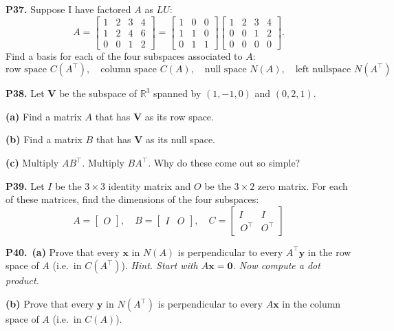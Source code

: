\documentclass[12pt]{amsart}
\newcommand{\bx}{\bm{x}}
\newcommand{\by}{\bm{y}}
\newcommand{\bV}{\bm{V}}
\newcommand{\bzero}{\bm{0}}
\newcommand{\RR}{\mathbb{R}}
\newcommand{\prob}[1]{\bigskip\noindent\textbf{#1.}\quad }
\newcommand{\epart}[1]{\medskip\noindent\textbf{(#1)}\quad }
\newcommand{\ppart}[1]{\,\textbf{(#1)}\quad }
\begin{document}
\prob{P37}  Suppose I have factored $A$ as $LU$:
    $$A = \begin{bmatrix} 1 & 2 & 3 & 4 \\
                         1 & 2 & 4 & 6 \\
                         0 & 0 & 1 & 2 \end{bmatrix}
        = \begin{bmatrix} 1 & 0 & 0 \\ 1 & 1 & 0 \\ 0 & 1 & 1 \end{bmatrix}
          \begin{bmatrix} 1 & 2 & 3 & 4 \\ 0 & 0 & 1 & 2 \\ 0 & 0 & 0 & 0 \end{bmatrix}.$$
Find a basis for each of the four subspaces associated to $A$:
    $$\text{row space } C(A^\top), \quad \text{column space } C(A), \quad \text{null space } N(A), \quad \text{left nullspace } N(A^\top)$$


\prob{P38}  Let $\bV$ be the subspace of $\RR^3$ spanned by $(1,-1,0)$ and $(0,2,1)$.

\epart{a} Find a matrix $A$ that has $\bV$ as its row space.

\epart{b} Find a matrix $B$ that has $\bV$ as its null space.

\epart{c} Multiply $AB^\top$.  Multiply $BA^\top$.  Why do these come out so simple?


\prob{P39}  Let $I$ be the $3\times 3$ identity matrix and $O$ be the $3\times 2$ zero matrix.  For each of these matrices, find the dimensions of the four subspaces:
    $$A = \begin{bmatrix} O \end{bmatrix}, \quad B = \begin{bmatrix} I & O \end{bmatrix}, \quad C = \begin{bmatrix} I & I \\ \,O^\top & O^\top \end{bmatrix}$$


\prob{P40} \ppart{a}  Prove that every $\bx$ in $N(A)$ is perpendicular to every $A^\top \by$ in the row space of $A$ (i.e.~in $C(A^\top)$).  \emph{Hint. Start with $A \bx = \bzero$.  Now compute a dot product.}

\epart{b}  Prove that every $\by$ in $N(A^\top)$ is perpendicular to every $A \bx$ in the column space of $A$ (i.e.~in $C(A)$).
\end{document}
